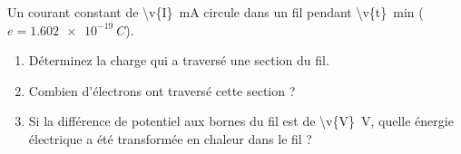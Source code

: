 Un courant constant de \qty{\v{I}}{mA} circule dans un fil pendant \qty{\v{t}}{min} ($e = \qty{1.602e-19}{C}$).

\begin{enumerate}[label=\alph*)]
    \item Déterminez la charge qui a traversé une section du fil.
    \item Combien d'électrons ont traversé cette section ?
    \item Si la différence de potentiel aux bornes du fil est de \qty{\v{V}}{V}, quelle énergie électrique a été transformée en chaleur dans le fil ?
\end{enumerate}
